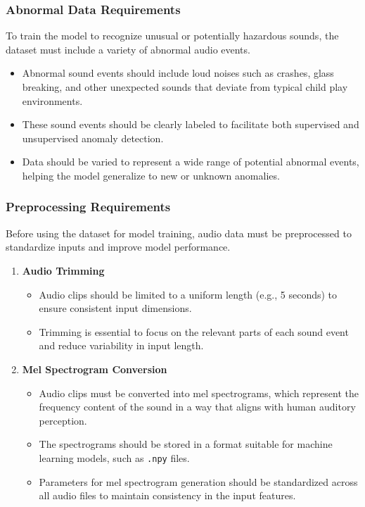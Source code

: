 \documentclass[conference]{IEEEtran}
\begin{document}
\subsubsection{Abnormal Data Requirements}
To train the model to recognize unusual or potentially hazardous sounds, the dataset must include a variety of abnormal audio events.

\begin{itemize}
    \item Abnormal sound events should include loud noises such as crashes, glass breaking, and other unexpected sounds that deviate from typical child play environments.
    \item These sound events should be clearly labeled to facilitate both supervised and unsupervised anomaly detection.
    \item Data should be varied to represent a wide range of potential abnormal events, helping the model generalize to new or unknown anomalies.
\end{itemize}

\subsubsection{Preprocessing Requirements}
Before using the dataset for model training, audio data must be preprocessed to standardize inputs and improve model performance.

\begin{enumerate}
    \item \textbf{Audio Trimming}
    \begin{itemize}
        \item Audio clips should be limited to a uniform length (e.g., 5 seconds) to ensure consistent input dimensions.
        \item Trimming is essential to focus on the relevant parts of each sound event and reduce variability in input length.
    \end{itemize}

    \item \textbf{Mel Spectrogram Conversion}
    \begin{itemize}
        \item Audio clips must be converted into mel spectrograms, which represent the frequency content of the sound in a way that aligns with human auditory perception.
        \item The spectrograms should be stored in a format suitable for machine learning models, such as \texttt{.npy} files.
        \item Parameters for mel spectrogram generation should be standardized across all audio files to maintain consistency in the input features.
    \end{itemize}
\end{enumerate}
\end{document}
